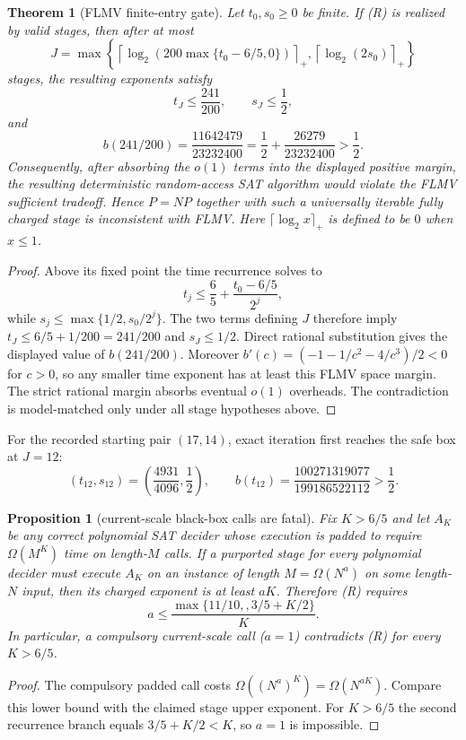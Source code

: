 \documentclass[11pt]{article}
\newtheorem{theorem}{Theorem}
\newtheorem{proposition}{Proposition}
\begin{document}
\begin{theorem}[FLMV finite-entry gate]
Let $t_0,s_0\ge0$ be finite.  If (R) is realized by valid stages, then after at
most
\[
 J=\max\left\{
 \left\lceil\log_2\!\left(200\max\{t_0-6/5,0\}\right)\right\rceil_+,
 \left\lceil\log_2\!\left(2s_0\right)\right\rceil_+
 \right\}
\]
stages, the resulting exponents satisfy
\[
 t_J\le\frac{241}{200},\qquad s_J\le\frac12,
\]
and
\[
 b(241/200)=\frac{11642479}{23232400}
 =\frac12+\frac{26279}{23232400}>\frac12.
\]
Consequently, after absorbing the $o(1)$ terms into the displayed positive
margin, the resulting deterministic random-access SAT algorithm would violate
the FLMV sufficient tradeoff.  Hence $P=NP$ together with such a universally
iterable fully charged stage is inconsistent with FLMV.
Here $\lceil\log_2 x\rceil_+$ is defined to be $0$ when $x\le1$.
\end{theorem}

\begin{proof}
Above its fixed point the time recurrence solves to
\[
 t_j\le\frac65+\frac{t_0-6/5}{2^j},
\]
while $s_j\le\max\{1/2,s_0/2^j\}$.  The two terms defining $J$ therefore imply
$t_J\le6/5+1/200=241/200$ and $s_J\le1/2$.  Direct rational substitution gives
the displayed value of $b(241/200)$.  Moreover
$b'(c)=(-1-1/c^2-4/c^3)/2<0$ for $c>0$, so any smaller time exponent has at
least this FLMV space margin.  The strict rational margin absorbs eventual
$o(1)$ overheads.  The contradiction is model-matched only under all stage
hypotheses above.
\end{proof}

For the recorded starting pair $(17,14)$, exact iteration first reaches the
safe box at $J=12$:
\[
 (t_{12},s_{12})=\left(\frac{4931}{4096},\frac12\right),\qquad
 b(t_{12})=\frac{100271319077}{199186522112}>\frac12.
\]

\begin{proposition}[current-scale black-box calls are fatal]
Fix $K>6/5$ and let $A_K$ be any correct polynomial SAT decider whose execution
is padded to require $\Omega(M^K)$ time on length-$M$ calls.  If a purported
stage for \emph{every} polynomial decider must execute $A_K$ on an instance of
length $M=\Omega(N^a)$ on some length-$N$ input, then its charged exponent is at
least $aK$.  Therefore (R) requires
\[
 a\le \frac{\max\{11/10,,3/5+K/2\}}{K}.
\]
In particular, a compulsory current-scale call ($a=1$) contradicts (R) for
every $K>6/5$.
\end{proposition}

\begin{proof}
The compulsory padded call costs $\Omega((N^a)^K)=\Omega(N^{aK})$.  Compare
this lower bound with the claimed stage upper exponent.  For $K>6/5$ the
second recurrence branch equals $3/5+K/2<K$, so $a=1$ is impossible.
\end{proof}
\end{document}
